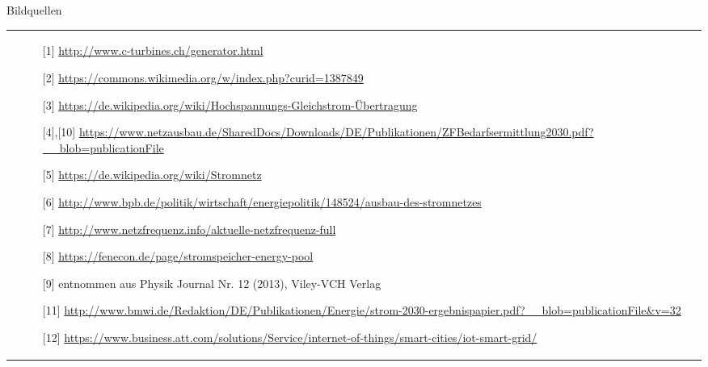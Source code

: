 \documentclass[aspectratio=1610, professionalfonts, 9pt]{beamer}
\begin{document}
\begin{frame}{Bildquellen}
  \begin{tabular}{p{}p{}}
&
 \begin{itemize}
   \item[{[1]}]  \url{http://www.c-turbines.ch/generator.html}
   \item[{[2]}] \url{https://commons.wikimedia.org/w/index.php?curid=1387849}
   \item[{[3]}] \url{https://de.wikipedia.org/wiki/Hochspannungs-Gleichstrom-Übertragung}
   \item[{[4],[10]}] \url{https://www.netzausbau.de/SharedDocs/Downloads/DE/Publikationen/ZFBedarfsermittlung2030.pdf?__blob=publicationFile}
\item[{[5]}]  \url{https://de.wikipedia.org/wiki/Stromnetz}
\item[{[6]}]  \url{http://www.bpb.de/politik/wirtschaft/energiepolitik/148524/ausbau-des-stromnetzes}
\item[{[7]}]  \url{http://www.netzfrequenz.info/aktuelle-netzfrequenz-full}
\item[{[8]}]  \url{https://fenecon.de/page/stromspeicher-energy-pool}
\item[{[9]}]  entnommen aus Physik Journal Nr. 12 (2013), Viley-VCH Verlag
\item[{[11]}] \url{http://www.bmwi.de/Redaktion/DE/Publikationen/Energie/strom-2030-ergebnispapier.pdf?__blob=publicationFile&v=32}
\item[{[12]}] \url{https://www.business.att.com/solutions/Service/internet-of-things/smart-cities/iot-smart-grid/}
\end{itemize}
\\
\end{tabular}
\end{frame}
\end{document}
